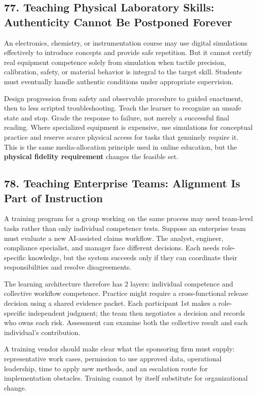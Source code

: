 \subsection*{77. Teaching Physical Laboratory Skills: Authenticity Cannot Be Postponed Forever}

An electronics, chemistry, or instrumentation course may use digital simulations effectively to introduce concepts and provide safe repetition. But it cannot certify real equipment competence solely from simulation when tactile precision, calibration, safety, or material behavior is integral to the target skill. Students must eventually handle authentic conditions under appropriate supervision.

Design progression from safety and observable procedure to guided enactment, then to less scripted troubleshooting. Teach the learner to recognize an unsafe state and stop. Grade the response to failure, not merely a successful final reading. Where specialized equipment is expensive, use simulations for conceptual practice and reserve scarce physical access for tasks that genuinely require it. This is the same media-allocation principle used in online education, but the \textbf{physical fidelity requirement} changes the feasible set.

\subsection*{78. Teaching Enterprise Teams: Alignment Is Part of Instruction}

A training program for a group working on the same process may need team-level tasks rather than only individual competence tests. Suppose an enterprise team must evaluate a new AI-assisted claims workflow. The analyst, engineer, compliance specialist, and manager face different decisions. Each needs role-specific knowledge, but the system succeeds only if they can coordinate their responsibilities and resolve disagreements.

The learning architecture therefore has 2 layers: individual competence and collective workflow competence. Practice might require a cross-functional release decision using a shared evidence packet. Each participant 1st makes a role-specific independent judgment; the team then negotiates a decision and records who owns each risk. Assessment can examine both the collective result and each individual's contribution.

A training vendor should make clear what the sponsoring firm must supply: representative work cases, permission to use approved data, operational leadership, time to apply new methods, and an escalation route for implementation obstacles. Training cannot by itself substitute for organizational change.

